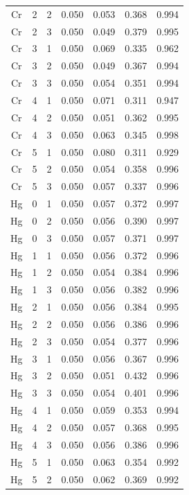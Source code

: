 \documentclass[ms, hidelinks]{uncgdissertationexp3}
\theoremstyle{plain}
\theoremstyle{definition}
\theoremstyle{remark}
\begin{document}
\begin{longtable}{ccccccc}
  Cr & 2 & 2 & 0.050 & 0.053 & 0.368 & 0.994\\
  \rowcolor{gray!6}  Cr & 2 & 3 & 0.050 & 0.049 & 0.379 & 0.995\\
  Cr & 3 & 1 & 0.050 & 0.069 & 0.335 & 0.962\\
  \rowcolor{gray!6}  Cr & 3 & 2 & 0.050 & 0.049 & 0.367 & 0.994\\
  Cr & 3 & 3 & 0.050 & 0.054 & 0.351 & 0.994\\
  \rowcolor{gray!6}  Cr & 4 & 1 & 0.050 & 0.071 & 0.311 & 0.947\\
  Cr & 4 & 2 & 0.050 & 0.051 & 0.362 & 0.995\\
  \rowcolor{gray!6}  Cr & 4 & 3 & 0.050 & 0.063 & 0.345 & 0.998\\
  Cr & 5 & 1 & 0.050 & 0.080 & 0.311 & 0.929\\
  \rowcolor{gray!6}  Cr & 5 & 2 & 0.050 & 0.054 & 0.358 & 0.996\\
  Cr & 5 & 3 & 0.050 & 0.057 & 0.337 & 0.996\\
  \rowcolor{gray!6}  Hg & 0 & 1 & 0.050 & 0.057 & 0.372 & 0.997\\
  Hg & 0 & 2 & 0.050 & 0.056 & 0.390 & 0.997\\
  \rowcolor{gray!6}  Hg & 0 & 3 & 0.050 & 0.057 & 0.371 & 0.997\\
  Hg & 1 & 1 & 0.050 & 0.056 & 0.372 & 0.996\\
  \rowcolor{gray!6}  Hg & 1 & 2 & 0.050 & 0.054 & 0.384 & 0.996\\
  Hg & 1 & 3 & 0.050 & 0.056 & 0.382 & 0.996\\
  \rowcolor{gray!6}  Hg & 2 & 1 & 0.050 & 0.056 & 0.384 & 0.995\\
  Hg & 2 & 2 & 0.050 & 0.056 & 0.386 & 0.996\\
  \rowcolor{gray!6}  Hg & 2 & 3 & 0.050 & 0.054 & 0.377 & 0.996\\
  Hg & 3 & 1 & 0.050 & 0.056 & 0.367 & 0.996\\
  \rowcolor{gray!6}  Hg & 3 & 2 & 0.050 & 0.051 & 0.432 & 0.996\\
  Hg & 3 & 3 & 0.050 & 0.054 & 0.401 & 0.996\\
  \rowcolor{gray!6}  Hg & 4 & 1 & 0.050 & 0.059 & 0.353 & 0.994\\
  Hg & 4 & 2 & 0.050 & 0.057 & 0.368 & 0.995\\
  \rowcolor{gray!6}  Hg & 4 & 3 & 0.050 & 0.056 & 0.386 & 0.996\\
  Hg & 5 & 1 & 0.050 & 0.063 & 0.354 & 0.992\\
  \rowcolor{gray!6}  Hg & 5 & 2 & 0.050 & 0.062 & 0.369 & 0.992\\

\end{longtable}
\end{document}
